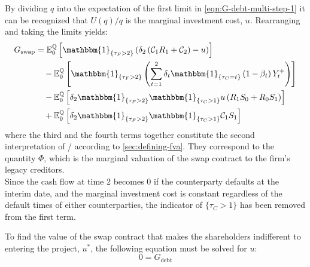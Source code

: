\documentclass[main.tex]{subfiles}
\begin{document}
        By dividing $q$ into the expectation of the first limit in \cref{eqn:G-debt-multi-step-1}
        it can be recognized that $U(q)/q$ is the marginal investment cost, $u$.
        Rearranging and taking the limits yields:
        \begin{align}
            G_{\text{swap}} &= 
            \mathbb{E}_{0}^{\rnmeasure}\left[
                \mathbbm{1}_{\{\tau_{F}>2\}}
                \left(
                    \delta_{2} \left(\mathcal{C}_{1} R_{1} + \mathcal{C}_{2}\right) - u
                \right)
            \right]
            \nonumber
            \\
            &\quad-
            \mathbb{E}_{0}^{\rnmeasure}\left[
                \mathbbm{1}_{\{\tau_{F}>2\}}
                \left(
                    \sum_{t=1}^{2} \delta_{t} \mathbbm{1}_{\{\tau_{C}=t\}}\left(1-\beta_t\right)Y_{t}^{+}
                \right)
            \right]
            \nonumber
            \\
            &\quad-
            \mathbb{E}_{0}^{\rnmeasure}\left[
                \delta_2 \mathbbm{1}_{\{\tau_{F}>2\}} \mathbbm{1}_{\{\tau_{C}>1\}} u \left(
                    R_{1} S_{0} + R_{0} S_{1}
                \right)
            \right]
            \nonumber
            \\
            &\quad+
            \mathbb{E}_{0}^{\rnmeasure}\left[
                \delta_2 \mathbbm{1}_{\{\tau_{F}>2\}} \mathbbm{1}_{\{\tau_{C}>1\}}
                \mathcal{C}_{1} S_1
            \right]
            \label{eqn:shareholders-value-multi-period-swap}
        \end{align}
        where the third and the fourth terms together constitute the second interpretation of \FVA/ according to \cref{sec:defining-fva}.
        They correspond to the quantity $\Phi$, which is the marginal valuation of the swap contract to the firm's legacy creditors.
        \\
        Since the cash flow at time 2 becomes 0 if the counterparty defaults at the interim date,
        and the marginal investment cost is constant regardless of the default times of either counterparties,
        the indicator of $\{\tau_{C}>1\}$ has been removed from the first term.

        To find the value of the swap contract that makes the shareholders indifferent to entering the project, $u^{\ast}$,
        the following equation must be solved for $u$:
        \begin{equation}
            0 = G_{\text{debt}}
        \end{equation}
\end{document}
